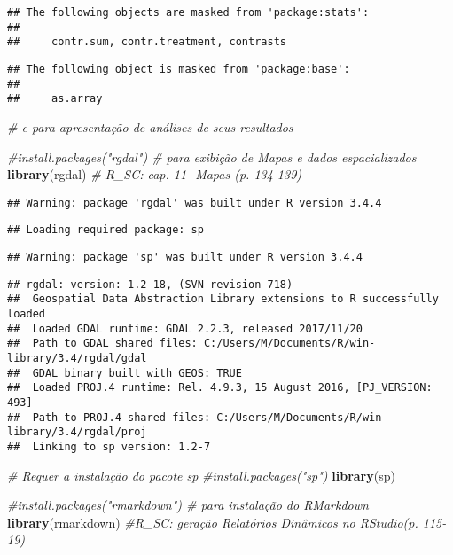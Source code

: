 \documentclass[]{article}
\newenvironment{Shaded}{\begin{snugshade}}{\end{snugshade}}
\newcommand{\KeywordTok}[1]{\textcolor[rgb]{0.13,0.29,0.53}{\textbf{#1}}}
\newcommand{\CommentTok}[1]{\textcolor[rgb]{0.56,0.35,0.01}{\textit{#1}}}
\newcommand{\NormalTok}[1]{#1}
\begin{document}
\begin{verbatim}
## The following objects are masked from 'package:stats':
## 
##     contr.sum, contr.treatment, contrasts
\end{verbatim}

\begin{verbatim}
## The following object is masked from 'package:base':
## 
##     as.array
\end{verbatim}

\begin{Shaded}
\begin{Highlighting}[]
                \CommentTok{# e para apresentação de análises de seus resultados}

\CommentTok{#install.packages("rgdal") # para exibição de Mapas e dados espacializados}
\KeywordTok{library}\NormalTok{(rgdal) }\CommentTok{# R_SC: cap. 11- Mapas (p. 134-139)}
\end{Highlighting}
\end{Shaded}

\begin{verbatim}
## Warning: package 'rgdal' was built under R version 3.4.4
\end{verbatim}

\begin{verbatim}
## Loading required package: sp
\end{verbatim}

\begin{verbatim}
## Warning: package 'sp' was built under R version 3.4.4
\end{verbatim}

\begin{verbatim}
## rgdal: version: 1.2-18, (SVN revision 718)
##  Geospatial Data Abstraction Library extensions to R successfully loaded
##  Loaded GDAL runtime: GDAL 2.2.3, released 2017/11/20
##  Path to GDAL shared files: C:/Users/M/Documents/R/win-library/3.4/rgdal/gdal
##  GDAL binary built with GEOS: TRUE 
##  Loaded PROJ.4 runtime: Rel. 4.9.3, 15 August 2016, [PJ_VERSION: 493]
##  Path to PROJ.4 shared files: C:/Users/M/Documents/R/win-library/3.4/rgdal/proj
##  Linking to sp version: 1.2-7
\end{verbatim}

\begin{Shaded}
\begin{Highlighting}[]
\CommentTok{# Requer a instalação do pacote sp}
\CommentTok{#install.packages("sp")}
\KeywordTok{library}\NormalTok{(sp)}

\CommentTok{#install.packages("rmarkdown") # para instalação do RMarkdown}
\KeywordTok{library}\NormalTok{(rmarkdown) }\CommentTok{#R_SC: geração Relatórios Dinâmicos no RStudio(p. 115-19)}
\end{Highlighting}
\end{Shaded}
\end{document}
